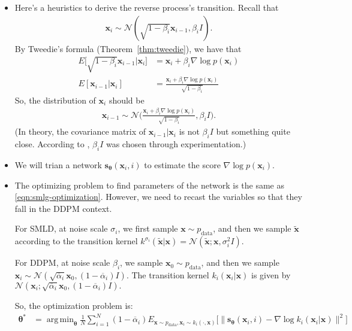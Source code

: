 \documentclass[10pt]{article}
\newcommand{\ve}[1]{\mathbf{#1}}
\newcommand{\mrm}[1]{\mathrm{#1}}
\newcommand{\ves}[1]{\boldsymbol{#1}}
\newcommand{\mcal}[1]{\mathcal{#1}}
\DeclareMathOperator*{\argmin}{arg\,min}
\begin{document}
\begin{itemize}
  \item Here's a heuristics to derive the reverse process's transition. Recall that 
  \begin{align*}
    \ve{x}_i \sim \mcal{N}(\sqrt{1 - \beta_i} \ve{x}_{i-1}, \beta_i I).
  \end{align*}
  By Tweedie's formula (Theorem~\ref{thm:tweedie}), we have that
  \begin{align*}
      E\Big[\sqrt{1-\beta_i} \ve{x}_{i-1}\Big|\ve{x}_i\Big] 
      &= \ve{x}_i + \beta_i \nabla \log p(\ve{x}_{i}) \\
      E[\ve{x}_{i-1}|\ve{x}_i]
      &= \frac{\ve{x}_i + \beta_i \nabla \log p(\ve{x}_{i})}{\sqrt{1 - \beta_i}}
  \end{align*}  
  So, the distribution of $\ve{x}_i$ should be
  \begin{align*}
    \ve{x}_{i-1} \sim \mcal{N}\bigg( \frac{\ve{x}_i + \beta_i \nabla \log p(\ve{x}_i)}{\sqrt{1 - \beta_i}}, \beta_i I \bigg).
  \end{align*}
  (In theory, the covariance matrix of $\ve{x}_{i-1}| \ve{x}_i$ is not $\beta_i I$ but something quite close. According to \cite{Ho:2020}, $\beta_i I$ was chosen through experimentation.)

  \item We will trian a network $\ve{s}_{\ves{\theta}}(\ve{x}_i, i)$ to estimate the score $\nabla \log p(\ve{x}_i)$.

  \item The optimizing problem to find parameters of the network is the same as \eqref{eqn:smlg-optimization}. However, we need to recast the variables so that they fall in the DDPM context.
  
  For SMLD, at noise scale $\sigma_i$, we first sample $\ve{x} \sim p_{\mrm{data}}$, and then we sample $\widetilde{\ve{x}}$ according to the transition kernel $k^{\sigma_i}(\widetilde{\ve{x}}|\ve{x}) = \mcal{N}(\widetilde{\ve{x}}; \ve{x}, \sigma_i^2 I)$.

  For DDPM, at noise scale $\beta_i$, we sample $\ve{x}_0 \sim p_{\mrm{data}}$, and then we sample $\ve{x}_i \sim \mcal{N}(\sqrt{\overline{\alpha}_i} \ve{x}_0, (1 - \overline{\alpha}_i) I)$. The transition kernel $k_i(\ve{x}_i|\ve{x})$ is given by $\mcal{N}(\ve{x}_i; \sqrt{\overline{\alpha}_i} \ve{x}_0, (1 - \overline{\alpha}_i) I).$

  So, the optimization problem is:
  \begin{align} \label{eqn:ddpm-optimization}
    \ves{\theta}^* 
    &= \argmin_{\ves{\theta}} \frac{1}{N} \sum_{i=1}^N (1 - \overline{\alpha}_i) E_{\ve{x}\sim p_{\mrm{data}}, \ve{x}_i \sim k_i(\cdot,\ve{x})} \big[ \big\| \ve{s}_{\ves{\theta}}(\ve{x}_i,i) - \nabla \log k_i(\ve{x}_i| \ve{x}) \big\|^2 \big]    
  \end{align}


\end{itemize}
\end{document}
